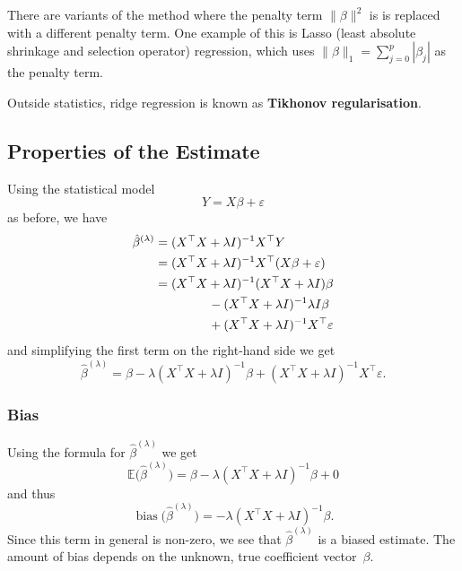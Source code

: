 \documentclass[
  a4paper,
]{article}
\theoremstyle{definition}
\theoremstyle{definition}
\theoremstyle{definition}
\theoremstyle{definition}
\theoremstyle{remark}
\begin{document}
There are variants of the method where the penalty term \(\|\beta\|^2\) is is
replaced with a different penalty term. One example of this is Lasso (least
absolute shrinkage and selection operator) regression, which uses \(\|\beta\|_1 = \sum_{j=0}^p |\beta_j|\) as the penalty term.

Outside statistics, ridge regression is known as \textbf{Tikhonov regularisation}.

\hypertarget{properties-of-the-estimate}{%
\subsection{Properties of the Estimate}\label{properties-of-the-estimate}}

Using the statistical model
\begin{equation*}
  Y = X \beta + \varepsilon
\end{equation*}
as before, we have
\begin{align*}
  \hat\beta^{(\lambda)}
  &= (X^\top X + \lambda I)^{-1} X^\top Y \\
  &= (X^\top X + \lambda I)^{-1} X^\top (X \beta + \varepsilon) \\
  &= (X^\top X + \lambda I)^{-1} (X^\top X + \lambda I) \beta \\
    &\hskip15mm - (X^\top X + \lambda I)^{-1} \lambda I \beta \\
    &\hskip15mm + (X^\top X + \lambda I)^{-1} X^\top \varepsilon
\end{align*}
and simplifying the first term on the right-hand side we get
\begin{equation}
  \hat\beta^{(\lambda)}
  = \beta
    - \lambda (X^\top X + \lambda I)^{-1} \beta
    + (X^\top X + \lambda I)^{-1} X^\top \varepsilon.   \label{eq:ridge-def}
\end{equation}

\hypertarget{bias}{%
\subsubsection{Bias}\label{bias}}

Using the formula for \(\hat\beta^{(\lambda)}\) we get
\begin{equation*}
  \mathbb{E}\bigl( \hat\beta^{(\lambda)} \bigr)
  = \beta - \lambda (X^\top X + \lambda I)^{-1} \beta + 0
\end{equation*}
and thus
\begin{equation*}
  \mathop{\mathrm{bias}}\bigl( \hat\beta^{(\lambda)} \bigr)
  = - \lambda (X^\top X + \lambda I)^{-1} \beta.
\end{equation*}
Since this term in general is non-zero, we see that \(\hat\beta^{(\lambda)}\)
is a biased estimate. The amount of bias depends on the unknown, true
coefficient vector~\(\beta\).
\end{document}
